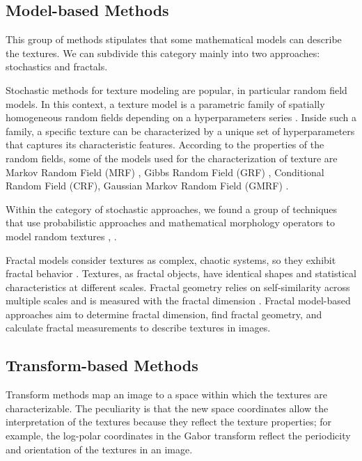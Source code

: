 \subsection{Model-based Methods}
This group of methods stipulates that some mathematical models can describe the textures. We can subdivide this category mainly into two approaches: stochastics and fractals.

Stochastic methods for texture modeling are popular, in particular random field models. In this context, a texture model is a parametric family of spatially homogeneous random fields depending on a hyperparameters series \citep{Winkler:Book:2003}. Inside such a family, a specific texture can be characterized by a unique set of hyperparameters that captures its characteristic features. According to the properties of the random fields, some of the models used for the characterization of texture are Markov Random Field (MRF) \citep{Hassner.Sklansky:CGIM:1980, Cross.Jain:PAMI:1983}, Gibbs Random Field (GRF) \citep{Derin.Cole:CVGIM:1986}, Conditional Random Field (CRF), Gaussian Markov Random Field (GMRF) \citep{Cohen.Fan.ea:PAMI:1991}.

Within the category of stochastic approaches, we found a group of techniques that use probabilistic approaches and mathematical morphology operators to model random textures \citep{Serra:CGIM:1980}, \citep{Cord.Bach.ea:JoM:2010}.

Fractal models consider textures as complex, chaotic systems, so they exhibit fractal behavior \citep{Petrolekas.Mitra:ISOP:1993}. Textures, as fractal objects, have identical shapes and statistical characteristics at different scales. Fractal geometry relies on self-similarity across multiple scales and is measured with the fractal dimension \citep{Keller.Chen.ea:CVGIP:1989}. Fractal model-based approaches aim to determine fractal dimension, find fractal geometry, and calculate fractal measurements to describe textures in images.


\subsection{Transform-based Methods}
Transform methods map an image to a space within which the textures are characterizable. The peculiarity is that the new space coordinates allow the interpretation of the textures because they reflect the texture properties; for example, the log-polar coordinates in the Gabor transform reflect the periodicity and orientation of the textures in an image.

